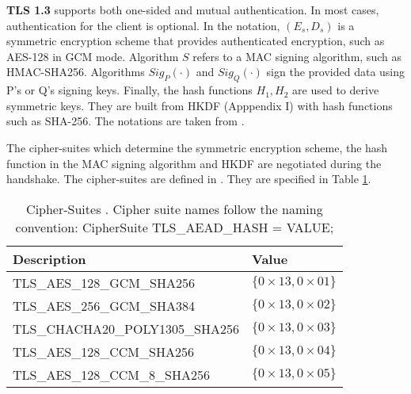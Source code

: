 \textbf{TLS 1.3} supports both one-sided and mutual authentication. In most cases, authentication for the client is optional. In the notation, $(E_s , D_s)$ is a symmetric encryption scheme that provides authenticated encryption, such as AES-128 in GCM mode.  Algorithm $S$ refers to a MAC signing algorithm, such as HMAC-SHA256. Algorithms $Sig_P(\cdot )$ and $Sig_Q(\cdot )$ sign the provided data using P's or Q's signing keys. Finally, the hash functions $H_1, H_2$ are used to derive symmetric keys. They are built from HKDF (Apppendix I) with hash functions such as SHA-256. The notations are taken from \cite{gradcourse}.

The cipher-suites which determine the symmetric encryption scheme, the hash function in the MAC signing algorithm and HKDF are negotiated during the handshake. The cipher-suites are defined in \cite{rfc8446}. They are specified in Table \ref{tab:ciphersuites}. 






\begin{table}[ht]
  \centering
  \begin{tabular}{|l|l|}
    \hline Description & Value \\
    \hline 
    TLS\_AES\_128\_GCM\_SHA256 & $\{0\times13,0\times01\}$ \\
    \hline TLS\_AES\_256\_GCM\_SHA384 & $\{0\times13,0\times02\}$ \\
    \hline TLS\_CHACHA20\_POLY1305\_SHA256 & $\{0\times13,0\times03\}$ \\
    \hline TLS\_AES\_128\_CCM\_SHA256 & $\{0\times13,0\times04\}$ \\
    \hline TLS\_AES\_128\_CCM\_8\_SHA256 & $\{0\times13,0\times05\}$ \\
    \hline
  \end{tabular}
  \caption{Cipher-Suites \cite{rfc8446}. Cipher suite names follow the naming convention: CipherSuite TLS\_AEAD\_HASH = VALUE;}
  \label{tab:ciphersuites}
\end{table}



